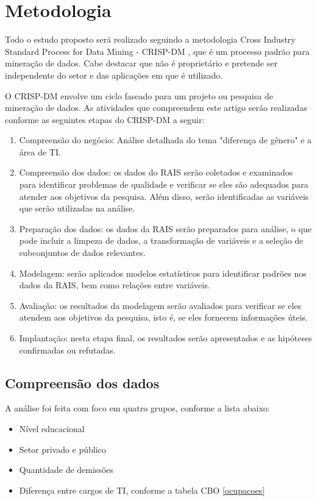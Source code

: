\section{Metodologia}

Todo o estudo proposto será realizado seguindo a metodologia Cross Industry Standard Process for Data Mining - CRISP-DM \cite{chapman2000crisp}, que é um processo padrão para mineração de dados.  Cabe destacar que não é proprietário e pretende ser independente do setor e das aplicações em que é utilizado.

O CRISP-DM envolve um ciclo faseado para um projeto ou pesquisa de mineração de dados. As atividades que compreendem este artigo serão realizadas conforme as seguintes etapas do CRISP-DM a seguir:

\begin{enumerate}
	\item Compreensão do negócio: Análise detalhada do tema "diferença de gênero" e a área de TI.
	\item Compreensão dos dados: os dados do RAIS serão coletados e examinados para identificar problemas de qualidade e verificar se eles são adequados para atender aos objetivos da pesquisa. Além disso, serão identificadas as variáveis que serão utilizadas na análise.
	\item Preparação dos dados: os dados da RAIS serão preparados para análise, o que pode incluir a limpeza de dados, a transformação de variáveis e a seleção de subconjuntos de dados relevantes. 
	\item Modelagem: serão aplicados modelos estatísticos para identificar padrões nos dados da RAIS, bem como relações entre variáveis.
	\item Avaliação: os resultados da modelagem serão avaliados para verificar se eles atendem aos objetivos da pesquisa, isto é, se eles fornecem informações úteis.
	\item Implantação: nesta etapa final, os resultados serão apresentados e as hipóteses confirmadas ou refutadas. 
\end{enumerate}
	      	      	      
\subsection{Compreensão dos dados}
	      	      	    
A análise foi feita com foco em quatro grupos, conforme a lista abaixo:

\begin{itemize}
	\item Nível educacional 	      	      	      	      	      
	\item Setor privado e público	      	      	      	      	     
	\item Quantidade de demissões    	      	      	      	     
	\item Diferença entre cargos de TI, conforme a tabela CBO \ref{ocupacoes}    	      	      	     
\end{itemize}
	      	      	    
